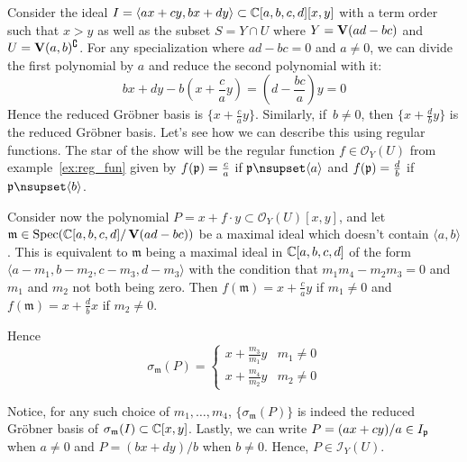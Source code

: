 \begin{example}\upshape
  Consider the ideal $I = \langle ax + cy, bx + dy \rangle \subset \mathbb{C}[a, b, c, d][x, y]$ with a term order such that $x > y$ as well as the subset $S = Y \cap U$ where $Y = \operatorname{\mathbf V}(ad - bc)$ and $U = \operatorname{\mathbf V}(a, b)^{\complement}$. For any specialization where $ad - bc = 0$ and $a \neq 0$, we can divide the first polynomial by $a$ and reduce the second polynomial with it:
  \[bx + dy - b\left(x + \frac c a y\right) = \left(d - \frac{bc}{a}\right)y = 0\]
  Hence the reduced Gröbner basis is $\{x + \frac c a y\}$. Similarly, if $\,b \neq 0$, then $\{x + \frac d b y\}$ is the reduced Gröbner basis. Let's see how we can describe this using regular functions. The star of the show will be the regular function $f \in \mathcal O_{Y}(U)$ from example~\ref{ex:reg_fun} given by $f(\mathfrak p) = \frac c a$ if $\p \nsupset \langle a \rangle$ and $f(\mathfrak p) = \frac d b$ if $\p \nsupset \langle b \rangle$.

  Consider now the polynomial $P = x + f \cdot y \subset \mathcal O_{Y}(U)[x, y]$, and let $\mathfrak m \in \operatorname{Spec}(\mathbb{C}[a, b, c, d]/\operatorname{\mathbf V}(ad - bc))$ be a maximal ideal which doesn't contain $\langle a, b \rangle$. This is equivalent to $\mathfrak m$ being a maximal ideal in $\mathbb{C}[a, b, c, d]$ of the form $\langle a - m_{1}, b - m_{2}, c - m_{3}, d - m_{3} \rangle$ with the condition that $m_{1} m_{4} - m_{2} m_{3} = 0$ and $m_{1}$ and $m_{2}$ not both being zero. Then $f(\mathfrak m) = x + \frac c a y$ if $m_{1} \neq 0$ and $f(\mathfrak m) = x + \frac d b x$ if $m_{2} \neq 0$.

  Hence \[\sigma_{\mathfrak m}(P) =
    \begin{cases}
      x + \frac{m_{3}}{m_{1}}y & m_{1} \neq 0 \\
      x + \frac{m_{4}}{m_{2}}y & m_{2} \neq 0
    \end{cases}
  \]

  Notice, for any such choice of $m_{1}, \dots, m_{4}$, $\{\sigma_{\mathfrak m}(P)\}$ is indeed the reduced Gröbner basis of $\sigma_{\mathfrak m}(I) \subset \mathbb{C}[x, y]$. Lastly, we can write $P = (ax + cy)/a \in I_{\mathfrak p}$ when $a \neq 0$ and $P = (bx + dy)/b$ when $b \neq 0$. Hence, $P \in \mathcal I_{Y}(U)$.
\end{example}





















